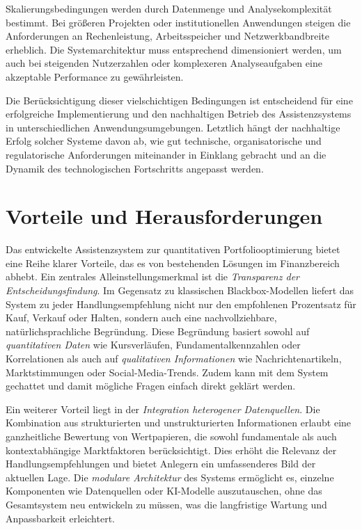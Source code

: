     Skalierungsbedingungen werden durch Datenmenge und Analysekomplexität bestimmt.
    Bei größeren Projekten oder institutionellen Anwendungen steigen die Anforderungen an Rechenleistung, Arbeitsspeicher und Netzwerkbandbreite erheblich.
    Die Systemarchitektur muss entsprechend dimensioniert werden, um auch bei steigenden Nutzerzahlen oder komplexeren Analyseaufgaben eine akzeptable Performance zu gewährleisten.

    Die Berücksichtigung dieser vielschichtigen Bedingungen ist entscheidend für eine erfolgreiche Implementierung und den nachhaltigen Betrieb des Assistenzsystems in unterschiedlichen Anwendungsumgebungen.
    Letztlich hängt der nachhaltige Erfolg solcher Systeme davon ab, wie gut technische, organisatorische und regulatorische Anforderungen miteinander in Einklang gebracht und an die Dynamik des technologischen Fortschritts angepasst werden.

  \section{Vorteile und Herausforderungen}

    Das entwickelte Assistenzsystem zur quantitativen Portfoliooptimierung bietet eine Reihe klarer Vorteile, das es von bestehenden Lösungen im Finanzbereich abhebt.
    Ein zentrales Alleinstellungsmerkmal ist die \emph{Transparenz der Entscheidungsfindung}.
    Im Gegensatz zu klassischen Blackbox-Modellen liefert das System zu jeder Handlungsempfehlung nicht nur den empfohlenen Prozentsatz für Kauf, Verkauf oder Halten, sondern auch eine nachvollziehbare, natürlichsprachliche Begründung.
    Diese Begründung basiert sowohl auf \emph{quantitativen Daten} wie Kursverläufen, Fundamentalkennzahlen oder Korrelationen als auch auf \emph{qualitativen Informationen} wie Nachrichtenartikeln, Marktstimmungen oder Social-Media-Trends.
    Zudem kann mit dem System gechattet und damit mögliche Fragen einfach direkt geklärt werden.

    Ein weiterer Vorteil liegt in der \emph{Integration heterogener Datenquellen}.
    Die Kombination aus strukturierten und unstrukturierten Informationen erlaubt eine ganzheitliche Bewertung von Wertpapieren, die sowohl fundamentale als auch kontextabhängige Marktfaktoren berücksichtigt.
    Dies erhöht die Relevanz der Handlungsempfehlungen und bietet Anlegern ein umfassenderes Bild der aktuellen Lage.
    Die \emph{modulare Architektur} des Systems ermöglicht es, einzelne Komponenten wie Datenquellen oder \acs{KI}-Modelle auszutauschen, ohne das Gesamtsystem neu entwickeln zu müssen, was die langfristige Wartung und Anpassbarkeit erleichtert.

